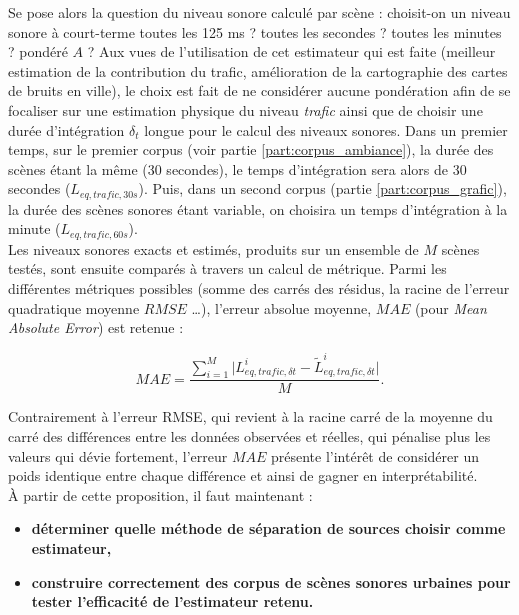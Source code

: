 Se pose alors la question du niveau sonore calculé par scène : choisit-on un niveau sonore à court-terme toutes les 125 ms ? toutes les secondes ? toutes les minutes ? pondéré $A$ ? Aux vues de l'utilisation de cet estimateur qui est faite (meilleur estimation de la contribution du trafic, amélioration de la cartographie des cartes de bruits en ville), le choix est fait de ne considérer aucune pondération afin de se focaliser sur une estimation physique du niveau \textit{trafic} ainsi que de choisir une durée d'intégration $\delta_t$ longue pour le calcul des niveaux sonores. 
Dans un premier temps, sur le premier corpus (voir partie \ref{part:corpus_ambiance}), la durée des scènes étant la même (30 secondes), le temps d'intégration sera alors de 30 secondes ($L_{eq,trafic,30s}$). Puis, dans un second corpus (partie \ref{part:corpus_grafic}), la durée des scènes sonores étant variable, on choisira un temps d'intégration à la minute ($L_{eq,trafic,60s}$).\\

Les niveaux sonores exacts et estimés, produits sur un ensemble de $M$ scènes testés, sont ensuite comparés à travers un calcul de métrique. Parmi les différentes métriques possibles (somme des carrés des résidus, la racine de l'erreur quadratique moyenne $RMSE$ \dots), l'erreur absolue moyenne, $MAE$ (pour \textit{Mean Absolute Error}) est retenue :

\begin{equation}
MAE = \frac{\sum_{i = 1}^{M} \vert L_{eq, trafic, \delta t}^i - \tilde{L}_{eq, trafic, \delta t}^i \vert}{M}.
\end{equation}

Contrairement à l'erreur RMSE, qui revient à la racine carré de la moyenne du carré des différences entre les données observées et réelles, qui pénalise plus les valeurs qui dévie fortement, l'erreur $MAE$ présente l'intérêt de considérer un poids identique entre chaque différence et ainsi de gagner en interprétabilité.\\

À partir de cette proposition, il faut maintenant : 
\begin{itemize}
\item \textbf{déterminer quelle méthode de séparation de sources choisir comme estimateur, }
\item \textbf{construire correctement des corpus de scènes sonores urbaines pour tester l'efficacité de l'estimateur retenu.}
\end{itemize}



%

%
%
%
